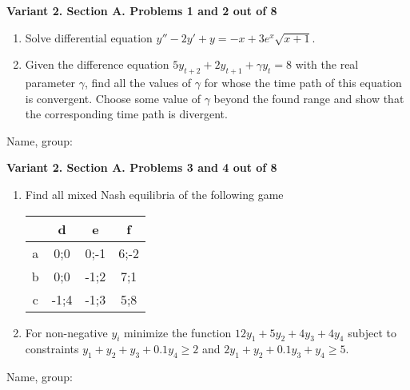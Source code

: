 \documentclass[12pt,a4paper]{article}
\begin{document}
\newpage
\textbf{Variant 2. Section A. Problems 1 and 2 out of 8}

\begin{enumerate}

\item Solve differential equation $y''-2y'+y=-x+3e^{x} \sqrt{x+1}$.

\item Given the difference equation $5y_{t+2} +2y_{t+1} +\gamma y_{t} =8$ with the real parameter $\gamma $, find all the values of  $\gamma$ for whose the time path of this equation is convergent.
Choose some value of $\gamma$ beyond the found range and show that the corresponding time path is divergent.



\end{enumerate}


\begin{framed}
\begin{minipage}{42em}
Name, group:\vspace*{3ex}\par
\noindent\dotfill
\end{minipage}
\end{framed}

\newpage
\textbf{Variant 2. Section A. Problems 3 and 4 out of 8}

\begin{enumerate}[resume]

\item Find all mixed Nash equilibria of the following game

\begin{tabular}{c|ccc}
  & d & e & f \\
\midrule
a & 0;0  & 0;-1 & 6;-2 \\
b & 0;0  & -1;2 & 7;1 \\
c & -1;4 & -1;3 & 5;8
\end{tabular}

\item For non-negative $y_i$ minimize the function $12y_1 + 5 y_2 + 4y_3 +4y_4$ subject to constraints $y_1 + y_2 + y_3 +0.1y_4 \geq 2$ and $2y_1+y_2+0.1y_3+y_4 \geq 5$.

\end{enumerate}


\begin{framed}
\begin{minipage}{42em}
Name, group:\vspace*{3ex}\par
\noindent\dotfill
\end{minipage}
\end{framed}
\end{document}
